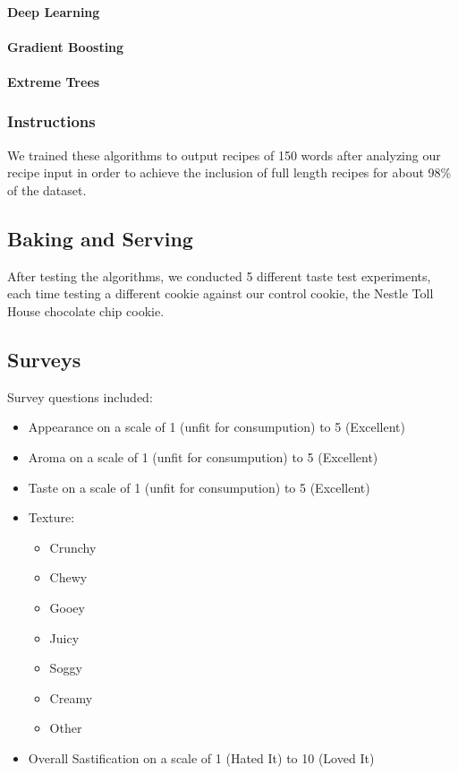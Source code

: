 \documentclass[11pt, a4paper]{article}
\begin{document}
		\paragraph{Deep Learning}
		\paragraph{Gradient Boosting}
		\paragraph{Extreme Trees}
		\subsubsection{Instructions}
		We trained these algorithms to output recipes of 150 words after analyzing our recipe input in order to achieve the inclusion of full length recipes for about 98\% of the dataset. 
		\subsection{Baking and Serving}
		After testing the algorithms, we conducted 5 different taste test experiments, each time testing a different cookie against our control cookie, the Nestle\textsuperscript{\textregistered} Toll House\textsuperscript{\textregistered} chocolate chip cookie.
		\subsection{Surveys}
		Survey questions included:
		\begin{itemize}
			\item Appearance  on a scale of 1 (unfit for consumpution) to 5 (Excellent) 
			\item Aroma on a scale of 1 (unfit for consumpution) to 5 (Excellent) 
			\item Taste on a scale of 1 (unfit for consumpution) to 5 (Excellent) 
			\item Texture:
			\begin{multicols}{2}
				\begin{itemize}
					\item Crunchy
					\item Chewy
					\item Gooey
					\item Juicy
					\item Soggy
					\item Creamy
					\item Other
				\end{itemize}
			\end{multicols}
		\item Overall Sastification on a scale of 1 (Hated It) to 10 (Loved It)
				
		\end{itemize}
\end{document}
